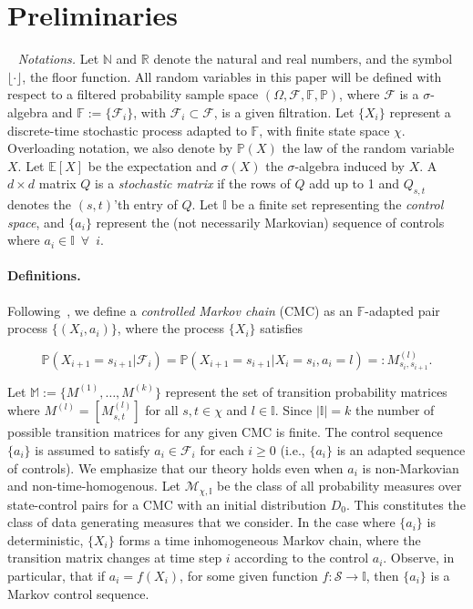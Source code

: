 \documentclass[opre,sglanonrev]{informs4}
\numberwithin{equation}{section}
\newcommand{\Ibb}{\mathbb{I}}
\newcommand{\Mbb}{\mathbb{M}}
\newcommand{\Nbb}{\mathbb{N}}
\newcommand{\Pbb}{\mathbb{P}}
\newcommand{\Fcal}{\mathcal{F}}
\newcommand{\Mcal}{\mathcal{M}}
\newcommand{\naturalset}{\Nbb}
\newcommand{\prob}{\Pbb}
\newcommand{\expec}{\mathbb{E}}
\newcommand{\probl}{\prob}
\newcommand{\initialD}{D_0}
\begin{document}
{\section{Preliminaries}~\label{sec:preliminaries}
\noindent\textit{Notations.} Let $\naturalset$ and $\mathbb{R}$ denote the natural and real numbers, and the symbol $\lfloor\cdot\rfloor$,  the floor function. 
All random variables in this paper will be defined with respect to a filtered probability sample space $(\Omega, \mathcal F, \mathbb F, \mathbb P)$, where $\mathcal F$ is a $\sigma$-algebra and $\mathbb F := \{\mathcal F_i\}$, with $\mathcal F_i \subset \mathcal F$, is a given filtration. 
Let $\{X_i\}$ represent a discrete-time stochastic process adapted to $\mathbb F$, with finite state space $\chi$. 
Overloading notation, we also denote by $\probl(X)$ the law of the random variable $X$. Let $\expec[X]$ be the expectation and $\sigma(X)$ the $\sigma$-algebra induced by $X$. 
A $d\times d$ matrix $Q$ is a \emph{stochastic matrix} if the rows of $Q$ add up to 1 and $Q_{s,t}$ denotes the $(s,t)$'th entry of $Q$. 
Let $\Ibb$ be a finite set representing the {\it control space}, and  $\{a_i\}$ represent the (not necessarily Markovian) sequence of controls where $a_i\in \Ibb\enspace\forall\enspace i$. 

\paragraph{Definitions.}
Following~\cite{borkar1991topics}, we define a {\it controlled Markov chain} (CMC) as an $\mathbb F$-adapted pair process $\{(X_i,a_i)\}$, where the process $\{X_i\}$ satisfies %
\begin{small}
\[
     \mathbb P \left( X_{i+1} = s_{i+1} | \mathcal F_i \right) = \mathbb P(X_{i+1} = s_{i+1} | X_i = s_i, a_i = l) =: M_{s_i,s_{i+1}}^{(l)}.
\]    
\end{small}
Let $\Mbb:=\{M^{(1)},\dots,M^{(k)}\}$ represent the set of transition probability matrices where $M^{(l)} = \left[  M^{(l)}_{s,t} \right]$ for all $s,t \in \chi$ and $l \in \Ibb$. Since $|\Ibb|=k$ the number of possible transition matrices for any given CMC is finite. The control sequence $\{a_i\}$ is assumed to satisfy $a_i \in \mathcal F_i$ for each $i \geq 0$ (i.e., $\{a_i\}$ is an adapted sequence of controls). { We emphasize that our theory holds even when $a_i$ is non-Markovian and non-time-homogenous. }
Let $\Mcal_{\chi,\Ibb}$ be the class of all probability measures over state-control pairs for a CMC with an initial distribution $\initialD$. This constitutes the class of data generating measures that we consider. 
In the case where $\{a_i\}$ is deterministic, $\{X_i\}$ forms a time inhomogeneous Markov chain, where the transition matrix changes at time step $i$ according to the control $a_i$.
Observe, in particular, that if $a_i = f(X_i)$, for some given function $f : \mathcal S \to \Ibb$, then $\{a_i\}$ is a Markov control sequence.  

}
\end{document}
